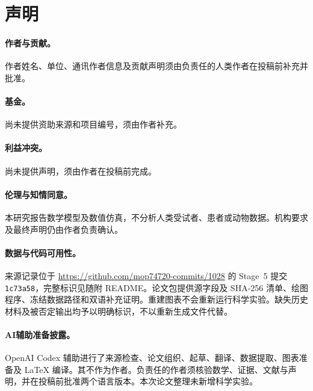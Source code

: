 \section*{声明}
\paragraph{作者与贡献。} 作者姓名、单位、通讯作者信息及贡献声明须由负责任的人类作者在投稿前补充并批准。
\paragraph{基金。} 尚未提供资助来源和项目编号，须由作者补充。
\paragraph{利益冲突。} 尚未提供声明，须由作者在投稿前完成。
\paragraph{伦理与知情同意。} 本研究报告数学模型及数值仿真，不分析人类受试者、患者或动物数据。机构要求及最终声明仍由作者负责确认。
\paragraph{数据与代码可用性。} 来源记录位于 \url{https://github.com/mop74720-commits/1028} 的 Stage~5 提交 \texttt{1c73a58}，完整标识见随附 README。论文包提供源字段及 SHA-256 清单、绘图程序、冻结数据路径和双语补充证明。重建图表不会重新运行科学实验。缺失历史材料及被否定输出均予以明确标识，不以重新生成文件代替。
\paragraph{AI辅助准备披露。} OpenAI Codex 辅助进行了来源检查、论文组织、起草、翻译、数据提取、图表准备及 LaTeX 编译。其不作为作者。负责任的作者须核验数学、证据、文献与声明，并在投稿前批准两个语言版本。本次论文整理未新增科学实验。
